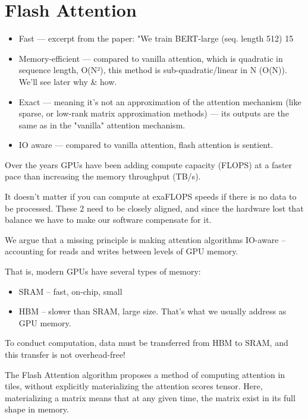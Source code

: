 \chapter{Flash Attention}

\begin{itemize}
	\item    Fast — excerpt from the paper: "We train BERT-large (seq. length 512) 15%
	\item Memory-efficient — compared to vanilla attention, which is quadratic in sequence length, O(N²), this method is sub-quadratic/linear in N (O(N)). We'll see later why & how.
	\item Exact — meaning it's not an approximation of the attention mechanism (like \eg sparse, or low-rank matrix approximation methods) — its outputs are the same as in the "vanilla" attention mechanism.
	\item IO aware — compared to vanilla attention, flash attention is sentient.
\end{itemize}

Over the years GPUs have been adding compute capacity (FLOPS) at a faster pace than increasing the memory throughput (TB/s).

It doesn't matter if you can compute at exaFLOPS speeds if there is no data to be processed. These 2 need to be closely aligned, and since the hardware lost that balance we have to make our software compensate for it.


We argue that a missing principle is making attention algorithms IO-aware – accounting for reads and writes between levels of GPU memory.


That is, modern GPUs have several types of memory:
\begin{itemize}
	\item SRAM – fast, on-chip, small
	\item HBM – slower than SRAM, large size. That's what we usually address as GPU memory.
\end{itemize}

 To conduct computation, data must be transferred from HBM to SRAM, and this transfer is not overhead-free!

The Flash Attention algorithm proposes a method of computing attention in tiles, without explicitly materializing the attention scores tensor. Here, materializing a matrix means that at any given time, the matrix exist in its full shape in memory.


